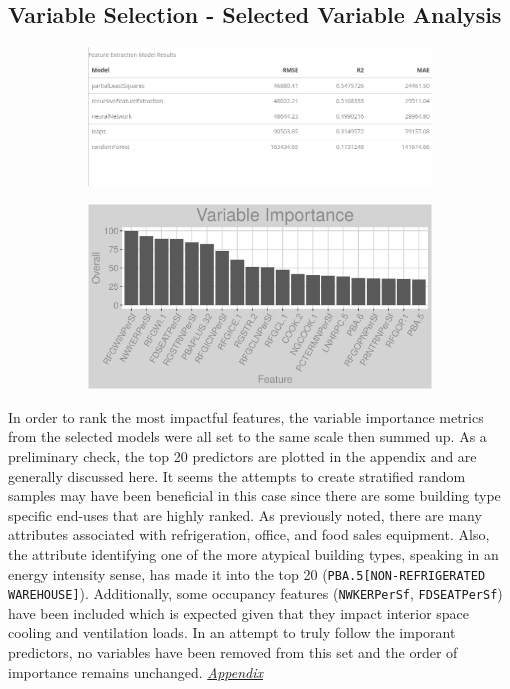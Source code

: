 \subsection{Variable Selection - Selected Variable Analysis}
\begin{figure}[h]
\begin{subfigure}{1\textwidth}
\centering
\includegraphics[width=.6\textwidth, height=0.2\textheight]{Images/electricity_psf_fe_summary.png}
\end{subfigure}
\begin{subfigure}{1\textwidth}
\centering
\includegraphics[width=.99\textwidth, height=0.3\textheight]{Images/electricity_psf_all_vars.png}
\end{subfigure}
\end{figure}
In order to rank the most impactful features, the variable importance metrics from the selected models were all set to the same scale then summed up.  As a preliminary check, the top 20 predictors are plotted in the appendix and are generally discussed here.  It seems the attempts to create stratified random samples may have been beneficial in this case since there are some building type specific end-uses that are highly ranked.  As previously noted, there are many attributes associated with refrigeration, office, and food sales equipment.  Also, the attribute identifying one of the more atypical building types, speaking in an energy intensity sense, has made it into the top 20 (\lstinline{PBA.5[NON-REFRIGERATED WAREHOUSE]}).  Additionally, some occupancy features (\lstinline{NWKERPerSf}, \lstinline{FDSEATPerSf}) have been included which is expected given that they impact interior space cooling and ventilation loads. In an attempt to truly follow the imporant predictors, no variables have been removed from this set and the order of importance remains unchanged.  \textit{\hyperref[appendix:electricity:sva]{Appendix}}